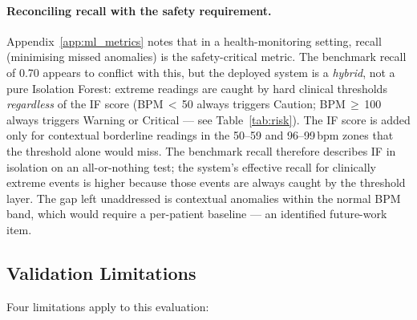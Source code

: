 \paragraph{Reconciling recall with the safety requirement.}
Appendix~\ref{app:ml_metrics} notes that in a health-monitoring setting, recall (minimising missed anomalies) is the safety-critical metric. The benchmark recall of 0.70 appears to conflict with this, but the deployed system is a \emph{hybrid}, not a pure Isolation Forest: extreme readings are caught by hard clinical thresholds \emph{regardless} of the IF score (BPM\,$<$\,50 always triggers Caution; BPM\,$\geq$\,100 always triggers Warning or Critical — see Table~\ref{tab:risk}). The IF score is added only for contextual borderline readings in the 50--59 and 96--99\,bpm zones that the threshold alone would miss. The benchmark recall therefore describes IF in isolation on an all-or-nothing test; the system's effective recall for clinically extreme events is higher because those events are always caught by the threshold layer. The gap left unaddressed is contextual anomalies within the normal BPM band, which would require a per-patient baseline — an identified future-work item.

\subsection{Validation Limitations}
\label{sec:discussion_limitations}

Four limitations apply to this evaluation:

